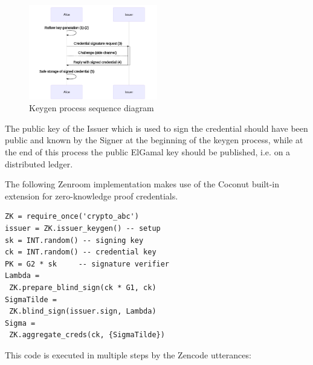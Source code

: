 \documentclass[twocolumn]{article}
\begin{document}
\begin{figure}
  \caption{Keygen process sequence diagram}
  \label{fig:keygen}
  \centering
  \includegraphics[width=0.5\textwidth]{keygen-seq}
\end{figure}

The public key of the Issuer which is used to sign the credential
should have been public and known by the Signer at the beginning of
the keygen process, while at the end of this process the public
ElGamal key should be published, i.e. on a distributed ledger.

The following Zenroom implementation makes use of the Coconut
built-in extension for zero-knowledge proof credentials.

\begin{lstlisting}[basicstyle=\tiny,style=lua]
ZK = require_once('crypto_abc')
issuer = ZK.issuer_keygen() -- setup
sk = INT.random() -- signing key
ck = INT.random() -- credential key
PK = G2 * sk     -- signature verifier
Lambda =
 ZK.prepare_blind_sign(ck * G1, ck)
SigmaTilde =
 ZK.blind_sign(issuer.sign, Lambda)
Sigma =
 ZK.aggregate_creds(ck, {SigmaTilde})
\end{lstlisting}

This code is executed in multiple steps by the Zencode utterances:
\end{document}
